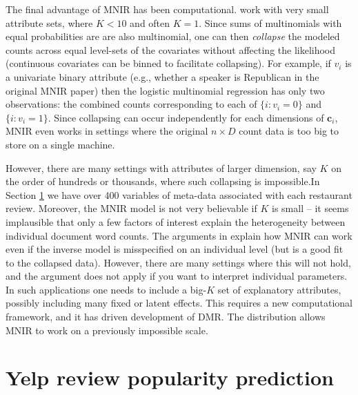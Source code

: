 \documentclass[12pt]{article}
\newcommand{\bm}[1]{\mathbf{#1}}
\begin{document}
The final advantage of MNIR has been computational.
\cite{taddy_multinomial_2013,taddy_measuring_2013} work with very small
attribute sets, where $K<10$ and often $K=1$.  Since sums of multinomials with
equal probabilities are are also multinomial, one can then {\it collapse} the
modeled counts across equal level-sets of the covariates without affecting the
likelihood (continuous covariates can be binned to facilitate collapsing).
For example, if $v_i$ is a univariate binary attribute (e.g., whether a
speaker is Republican in the original MNIR paper) then the logistic multinomial regression
  has only two observations: the combined counts
corresponding to each of $\{i:v_i=0\}$ and $\{i:v_i=1\}$. Since collapsing can
occur independently for each dimensions of $\bm{c}_i$,  MNIR  even
works in settings where the original $n\times D$ count data is too big to
store on a single machine.

However, there are many settings with attributes of  larger dimension, say $K$
on the order of hundreds or thousands, where such collapsing is impossible.In
Section \ref{YELP} we have over 400 variables of meta-data associated with
each restaurant review.  Moreover,  the MNIR model is not very believable if
$K$ is small -- it seems implausible that only a few factors of interest
explain the heterogeneity between individual document word counts. The
arguments in \cite{taddy_multinomial_2013,taddy_rejoinder:_2013} explain how
MNIR can work even if the inverse model is misspecified on an individual level
(but is a good fit to the collapsed data).  However, there are many settings
where this will not hold, and the argument does not apply if you want to
interpret individual parameters. In such applications one needs to
include a big-$K$ set of explanatory attributes, possibly including many fixed
or latent effects.   This requires a new computational framework, and it has
driven development of DMR.  The distribution allows MNIR to work on a
previously impossible scale.


\section{Yelp review popularity prediction}
\label{YELP}
\end{document}

